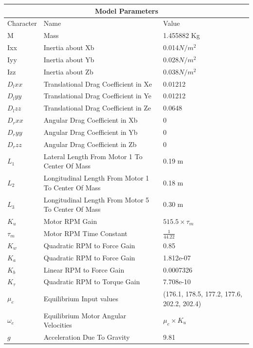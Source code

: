 \documentclass[12pt,a4paper,twoside]{report}
\begin{document}
			\newpage
			
			\begin{table}[h!]
			\centering
			\begin{tabular}{ |p{1.5cm}||p{9.5cm}|p{5cm}|  }
				\hline
				\multicolumn{3}{|c|}{Model Parameters} \\
				\hline
				Character& Name  & Value  \\
				\hline
				M        &  Mass                                                 & 1.455882 Kg\\
				Ixx      &  Inertia about Xb                                     & 0.014$N/m^2$\\
				Iyy      &  Inertia about Yb                                     & 0.028$N/m^2$\\
				Izz      &  Inertia about Zb                                     & 0.038$N/m^2$\\
				$D_lxx$  &  Translational Drag Coefficient in Xe                 & 0.01212\\
				$D_lyy$  &  Translational Drag Coefficient in Ye                 & 0.01212\\
				$D_lzz$  &  Translational Drag Coefficient in Ze                 & 0.0648\\
				$D_rxx$  &  Angular Drag Coefficient in Xb                       & 0\\
				$D_ryy$  &  Angular Drag Coefficient in Yb                       & 0\\
				$D_rzz$  &  Angular Drag Coefficient in Zb                       & 0\\
				$L_1$    &  Lateral Length From Motor 1 To Center Of Mass        & 0.19 m\\
				$L_2$    &  Longitudinal Length From Motor 1 To Center Of Mass   & 0.18 m\\
				$L_3$    &  Longitudinal Length From Motor 5 To Center Of Mass   & 0.30 m\\
				$K_u$    &  Motor RPM Gain                                       & $515.5 \times \tau_m$\\
				$\tau_m$ &  Motor RPM Time Constant                              & $\frac{1}{44.22}$\\
				$K_w$    &  Quadratic RPM to Force Gain                          & 0.85\\
				$K_a$    &  Quadratic RPM to Force Gain                          & 1.812e-07\\
				$K_b$    &  Linear RPM to Force Gain                             & 0.0007326\\
				$K_\tau$ &  Quadratic RPM to Torque Gain                         & 7.708e-10\\
				$\mu_e$  &  Equilibrium Input values                         	 & (176.1, 178.5, 177.2, 177.6, 202.2, 202.4)\\
				$\omega_e$& Equilibrium Motor Angular Velocities                 & $\mu_e \times K_u $\\
				$g$      & Acceleration Due To Gravity                           & 9.81 \\
				

\end{tabular}
\end{table}
\end{document}
